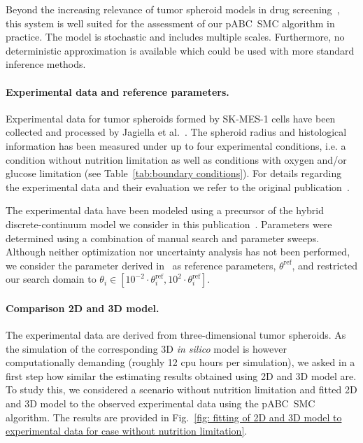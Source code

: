 \documentclass[10pt,letterpaper]{article}
\begin{document}
Beyond the increasing relevance of tumor spheroid models in drug screening~\cite{KwapiszewskaMic2014}, this system is well suited for the assessment of our pABC~SMC algorithm in practice. The model is stochastic and includes multiple scales. Furthermore, no deterministic approximation is available which could be used with more standard inference methods.

\paragraph*{Experimental data and reference parameters.}
Experimental data for tumor spheroids formed by SK-MES-1 cells have been collected and processed by Jagiella et al.~\cite{JagiellaMul2015}. The spheroid radius and histological information has been measured under up to four experimental conditions, i.e. a condition without nutrition limitation as well as conditions with oxygen and/or glucose limitation  (see Table~\ref{tab:boundary conditions}). For details regarding the experimental data and their evaluation we refer to the original publication~\cite{JagiellaMul2015}.

The experimental data have been modeled using a precursor of the hybrid discrete-continuum model we consider in this publication~\cite{JagiellaMul2015}. Parameters were determined using a combination of manual search and parameter sweeps. Although neither optimization nor uncertainty analysis has not been performed, we consider the parameter derived in~\cite{JagiellaMul2015} as reference parameters, $\theta^{\text{ref}}$, and restricted our search domain to $\theta_i \in [10^{-2} \cdot \theta_i^{\text{ref}},10^{2} \cdot\theta_i^{\text{ref}}]$.

\paragraph*{Comparison 2D and 3D model.}
The experimental data are derived from three-dimensional tumor spheroids. As the simulation of the corresponding 3D \textit{in silico} model is however computationally demanding (roughly 12 cpu hours per simulation), we asked in a first step how similar the estimating results obtained using 2D and 3D model are. To study this, we considered a scenario without nutrition limitation and fitted 2D and 3D model to the observed experimental data using the pABC~SMC algorithm. The results are provided in Fig.~\ref{fig: fitting of 2D and 3D model to experimental data for case without nutrition limitation}.
\end{document}
